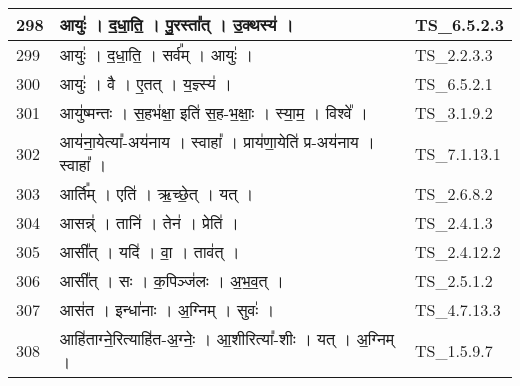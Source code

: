 \documentclass[17pt]{extarticle}
\begin{document}
\begin{longtable}{||p{0.4in}||p{4.9in}||p{0.9in}||}
    \hline
        
    298 & आयुः॑   ।   द॒धा॒ति॒   ।   पु॒रस्ता᳚त्   ।   उ॒क्थस्य॑   ।    & TS\_6.5.2.3       \\
    
    \hline
        
    299 & आयुः॑   ।   द॒धा॒ति॒   ।   सर्व᳚म्   ।   आयुः॑   ।    & TS\_2.2.3.3       \\
    
    \hline
        
    300 & आयुः॑   ।   वै   ।   ए॒तत्   ।   य॒ज्ञ्स्य॑   ।    & TS\_6.5.2.1       \\
    
    \hline
        
    301 & आयु॑ष्मन्तः   ।   स॒हभ॑क्षा॒ इति॑ स॒ह{-}भ॒क्षाः॒   ।   स्या॒म॒   ।   विश्वे᳚   ।    & TS\_3.1.9.2       \\
    
    \hline
        
    302 & आय॑ना॒येत्या᳚{-}अय॑नाय   ।   स्वाहा᳚   ।   प्राय॑णा॒येति॑ प्र{-}अय॑नाय   ।   स्वाहा᳚   ।    & TS\_7.1.13.1       \\
    
    \hline
        
    303 & आर्ति᳚म्   ।   एति॑   ।   ऋ॒च्छे॒त्   ।   यत्   ।    & TS\_2.6.8.2       \\
    
    \hline
        
    304 & आसन्न्॑   ।   तानि॑   ।   तेन॑   ।   प्रेति॑   ।    & TS\_2.4.1.3       \\
    
    \hline
        
    305 & आसी᳚त्   ।   यदि॑   ।   वा॒   ।   ताव॑त्   ।    & TS\_2.4.12.2       \\
    
    \hline
        
    306 & आसी᳚त्   ।   सः   ।   क॒पिञ्ज॑लः   ।   अ॒भ॒व॒त्   ।    & TS\_2.5.1.2       \\
    
    \hline
        
    307 & आस॑त   ।   इन्धा॑नाः   ।   अ॒ग्निम्   ।   सुवः॑   ।    & TS\_4.7.13.3       \\
    
    \hline
        
    308 & आहि॑ताग्ने॒रित्याहि॑त{-}अ॒ग्नेः॒   ।   आ॒शीरित्या᳚{-}शीः   ।   यत्   ।   अ॒ग्निम्   ।    & TS\_1.5.9.7       \\
    

\end{longtable}
\end{document}
